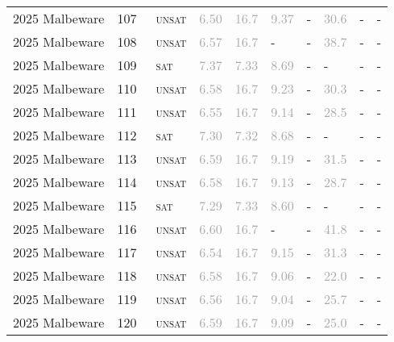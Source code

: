 \begin{center}
{\begin{longtable}{@{}llllllllll@{}}
2025 Malbeware & 107 & ~\textsc{unsat} & \textcolor{darkgray}{6.50} & \textcolor{darkgray}{16.7} & \textcolor{darkgray}{9.37} & - & \textcolor{darkgray}{30.6} & - & - \\
2025 Malbeware & 108 & ~\textsc{unsat} & \textcolor{darkgray}{6.57} & \textcolor{darkgray}{16.7} & - & - & \textcolor{darkgray}{38.7} & - & - \\
2025 Malbeware & 109 & ~\textsc{sat} & \textcolor{darkgray}{7.37} & \textcolor{darkgray}{7.33} & \textcolor{darkgray}{8.69} & - & - & - & - \\
2025 Malbeware & 110 & ~\textsc{unsat} & \textcolor{darkgray}{6.58} & \textcolor{darkgray}{16.7} & \textcolor{darkgray}{9.23} & - & \textcolor{darkgray}{30.3} & - & - \\
2025 Malbeware & 111 & ~\textsc{unsat} & \textcolor{darkgray}{6.55} & \textcolor{darkgray}{16.7} & \textcolor{darkgray}{9.14} & - & \textcolor{darkgray}{28.5} & - & - \\
2025 Malbeware & 112 & ~\textsc{sat} & \textcolor{darkgray}{7.30} & \textcolor{darkgray}{7.32} & \textcolor{darkgray}{8.68} & - & - & - & - \\
2025 Malbeware & 113 & ~\textsc{unsat} & \textcolor{darkgray}{6.59} & \textcolor{darkgray}{16.7} & \textcolor{darkgray}{9.19} & - & \textcolor{darkgray}{31.5} & - & - \\
2025 Malbeware & 114 & ~\textsc{unsat} & \textcolor{darkgray}{6.58} & \textcolor{darkgray}{16.7} & \textcolor{darkgray}{9.13} & - & \textcolor{darkgray}{28.7} & - & - \\
2025 Malbeware & 115 & ~\textsc{sat} & \textcolor{darkgray}{7.29} & \textcolor{darkgray}{7.33} & \textcolor{darkgray}{8.60} & - & - & - & - \\
2025 Malbeware & 116 & ~\textsc{unsat} & \textcolor{darkgray}{6.60} & \textcolor{darkgray}{16.7} & - & - & \textcolor{darkgray}{41.8} & - & - \\
2025 Malbeware & 117 & ~\textsc{unsat} & \textcolor{darkgray}{6.54} & \textcolor{darkgray}{16.7} & \textcolor{darkgray}{9.15} & - & \textcolor{darkgray}{31.3} & - & - \\
2025 Malbeware & 118 & ~\textsc{unsat} & \textcolor{darkgray}{6.58} & \textcolor{darkgray}{16.7} & \textcolor{darkgray}{9.06} & - & \textcolor{darkgray}{22.0} & - & - \\
2025 Malbeware & 119 & ~\textsc{unsat} & \textcolor{darkgray}{6.56} & \textcolor{darkgray}{16.7} & \textcolor{darkgray}{9.04} & - & \textcolor{darkgray}{25.7} & - & - \\
2025 Malbeware & 120 & ~\textsc{unsat} & \textcolor{darkgray}{6.59} & \textcolor{darkgray}{16.7} & \textcolor{darkgray}{9.09} & - & \textcolor{darkgray}{25.0} & - & - \\

\end{longtable}}
\end{center}
